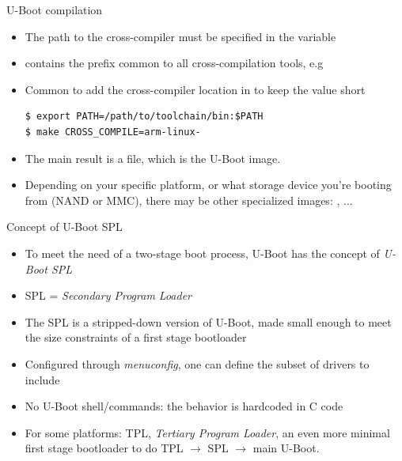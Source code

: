 \begin{frame}[fragile]{U-Boot compilation}
  \begin{itemize}
  \item The path to the cross-compiler must be specified in the
     variable
  \item {} contains the prefix common to all
    cross-compilation tools, e.g 
  \item Common to add the cross-compiler location in  to
    keep the  value short
\begin{verbatim}
$ export PATH=/path/to/toolchain/bin:$PATH
$ make CROSS_COMPILE=arm-linux-
\end{verbatim}
  \item The main result is a  file, which is the
    U-Boot image.
  \item Depending on your specific platform, or what storage device
    you're booting from (NAND or MMC), there may be other specialized
    images: , ...
  \end{itemize}
\end{frame}

\begin{frame}{Concept of U-Boot SPL}
  \begin{itemize}
  \item To meet the need of a two-stage boot process, U-Boot has the
    concept of {\em U-Boot SPL}
  \item SPL = {\em Secondary Program Loader}
  \item The SPL is a stripped-down version of U-Boot, made small
    enough to meet the size constraints of a first stage bootloader
  \item Configured through {\em menuconfig}, one can define the subset
    of drivers to include
  \item No U-Boot shell/commands: the behavior is hardcoded in C code
  \item For some platforms: TPL, {\em Tertiary Program Loader}, an
    even more minimal first stage bootloader to do TPL
    $\rightarrow$ SPL $\rightarrow$ main U-Boot.
  \end{itemize}
\end{frame}


